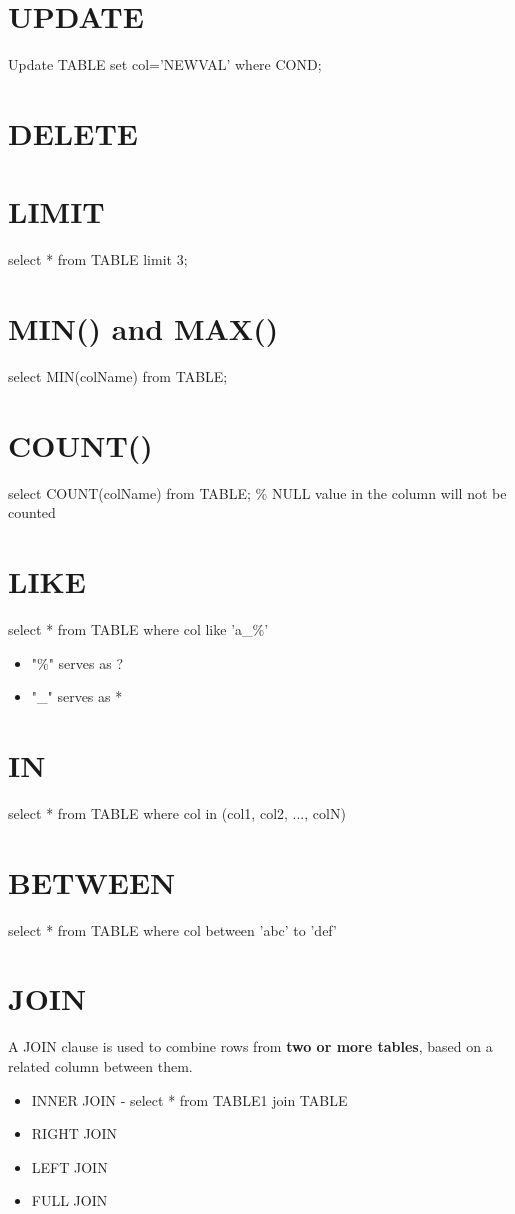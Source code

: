 		\section{UPDATE}
			Update TABLE set col='NEWVAL' where COND;

		\section{DELETE}

		\section{LIMIT}
			select * from TABLE limit 3;

		\section{MIN() and MAX()}
			select MIN(colName) from TABLE;

		\section{COUNT()}
			select COUNT(colName) from TABLE; \% NULL value in the column will not be counted

		\section{LIKE}
			select * from TABLE where col like 'a\_\%'

			\begin{itemize}
				\item "\%" serves as ?
				\item "\_" serves as *
			\end{itemize}

		\section{IN}
			select * from TABLE where col in (col1, col2, ..., colN)

		\section{BETWEEN}
			select * from TABLE where col between 'abc' to 'def'

		\section{JOIN}
			A JOIN clause is used to combine rows from \textbf{two or more tables}, based on a related column between them.
			\begin{itemize}
				\item INNER JOIN - select * from TABLE1 join TABLE 
				\item RIGHT JOIN
				\item LEFT JOIN
				\item FULL JOIN
			\end{itemize}